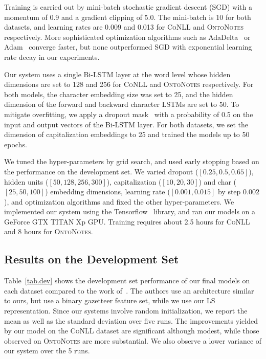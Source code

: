 \documentclass[11pt]{article}
\newcommand{\conll}{\textsc{CoNLL}}
\newcommand{\onto}{\textsc{OntoNotes}}
\newcommand{\lr}{\textsc{LS}}
\begin{document}
	Training is carried out by mini-batch stochastic gradient descent (SGD) with a momentum of 0.9 and a gradient clipping of 5.0. The mini-batch is 10 for both datasets, and learning rates are 0.009 and 0.013 for \conll{} and \onto{} respectively. More sophisticated optimization algorithms such as AdaDelta~\cite{zeiler2012adadelta} or Adam~\cite{kingma2014adam} converge faster, but none outperformed  SGD with exponential learning rate decay in our experiments.  
	
	
	Our system uses a single Bi-LSTM layer at the word level whose hidden dimensions are set to 128 and 256 for \conll{} and \onto{} respectively. 	For both models, the character embedding size was set to 25, and the hidden dimension of the forward and backward character LSTMs are set to 50. To mitigate overfitting, we apply a dropout mask~\cite{srivastava2014dropout} with a probability of 0.5 on the input and output vectors of the Bi-LSTM layer. For both datasets, we set the dimension of capitalization embeddings to 25 and trained the models up to 50 epochs.
	
	We tuned the hyper-parameters by grid search, and used early stopping based on the performance on the development set. We varied dropout ($[0.25, 0.5, 0.65]$), hidden units ($[50, 128, 256, 300]$), capitalization ($[10, 20, 30]$) and char ($[25, 50, 100]$) embedding dimensions, learning rate ($[0.001, 0.015]$ by step $0.002$), and optimization algorithms and fixed the other hyper-parameters. We implemented our system using the Tensorflow~\cite{abadi2016tensorflow} library, and ran our models on a GeForce GTX TITAN Xp GPU. Training requires about 2.5 hours for \conll{} and 8 hours for \onto{}. 
	
	\subsection{Results on the Development Set} 
	\label{sec:dev}

	Table~\ref{tab.dev} shows the development set performance of our final models on each dataset compared to the work of~. The authors use an architecture similar to ours, but use a binary gazetteer feature set, while we use our \lr{}  representation. Since our systems involve random initialization, we report the mean as well as the standard deviation over five runs. The improvements yielded by our model on the \conll{} dataset are significant although modest, while those observed on \onto{} are more substantial. We also observe a lower variance of our system over the 5 runs. 
	
\end{document}
